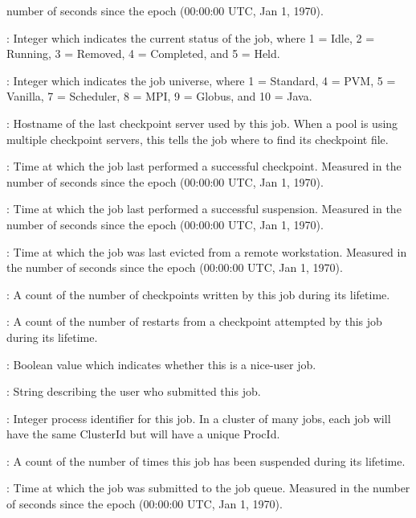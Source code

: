 \begin{description}
number of seconds since the epoch (00:00:00 UTC, Jan 1, 1970).
%
\item[\AdAttr{JobStatus}] : Integer which indicates the current
status of the job, where 1 = Idle, 2 = Running, 3 = Removed, 4 =
Completed, and 5 = Held.
%
\item[\AdAttr{JobUniverse}] : Integer which indicates the job
universe, where 1 = Standard, 4 = PVM, 5 = Vanilla, 7 = Scheduler,
8 = MPI, 9 = Globus, and 10 = Java.
%
\item[\AdAttr{LastCkptServer}] : Hostname of the last checkpoint
server used by this job.  When a pool is using multiple checkpoint
servers, this tells the job where to find its checkpoint file.
%
\item[\AdAttr{LastCkptTime}] : Time at which the job last performed a
successful checkpoint.  Measured in the number of seconds since the
epoch (00:00:00 UTC, Jan 1, 1970).
%
\item[\AdAttr{LastSuspensionTime}] : Time at which the job last performed a
successful suspension.  Measured in the number of seconds since the
epoch (00:00:00 UTC, Jan 1, 1970).
%
\item[\AdAttr{LastVacateTime}] : Time at which the job was last
evicted from a remote workstation.  Measured in the number of seconds
since the epoch (00:00:00 UTC, Jan 1, 1970).
%
\item[\AdAttr{NumCkpts}] : A count of the number of checkpoints
written by this job during its lifetime.
%
\item[\AdAttr{NumRestarts}] : A count of the number of restarts from a
checkpoint attempted by this job during its lifetime.
%
\item[\AdAttr{NiceUser}] : Boolean value which indicates whether
this is a nice-user job.
%
\item[\AdAttr{Owner}] : String describing the user who submitted this
job.
%
\item[\AdAttr{ProcId}] : Integer process identifier for this job.  In
a cluster of many jobs, each job will have the same ClusterId but will
have a unique ProcId.
%
\item[\AdAttr{TotalSuspensions}] : A count of the number of times this job
has been suspended during its lifetime.
%
\item[\AdAttr{QDate}] : Time at which the job was submitted to the job
queue.  Measured in the
number of seconds since the epoch (00:00:00 UTC, Jan 1, 1970).
%
\end{description}
